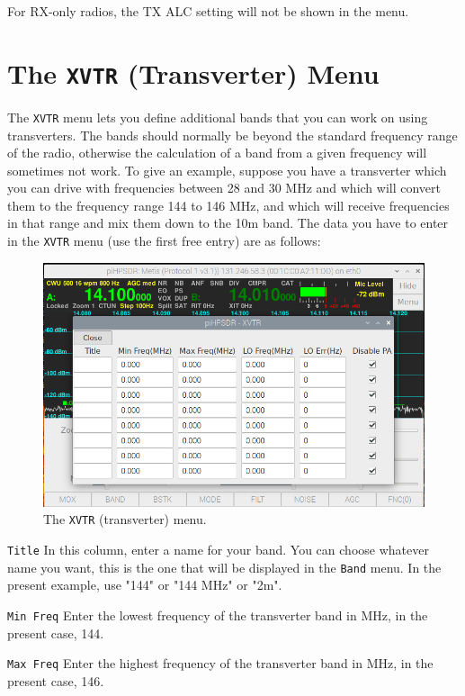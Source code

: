 \documentclass[12pt]{book}
\def\rett#1{\texttt{\color{red}#1}}
\def\bltt#1{\texttt{\color{blue}#1}}
\begin{document}
For RX-only radios, the TX ALC setting will not be shown in the menu.

\section{The \texttt{XVTR} (Transverter) Menu}

The \bltt{XVTR} menu lets you define additional bands 
that you can work on using transverters. The bands
should normally be beyond the standard frequency range of
the radio, otherwise the calculation of a band from
a given frequency will sometimes not work. To give an example,
suppose you have a transverter which you can drive with frequencies
between 28 and 30 MHz and which will convert them to the frequency
range 144 to 146 MHz, and which will receive frequencies in that
range and mix them down to the 10m band. The data you have to enter
in the \bltt{XVTR} menu (use the first free entry) are as follows:
\begin{figure}[ht]
\center
\includegraphics[width=12cm]{XVTRMenu.png}
\caption{The \bltt{XVTR} (transverter) menu.}
\label{fig:XVTRMenu}
\end{figure}



\rett{Title} In this column, enter a name for your band. You can choose
whatever name you want, this is the one that will be displayed in the
\bltt{Band} menu. In the present example, use "144" or "144 MHz" or "2m".

\rett{Min Freq} Enter the lowest frequency of the transverter band in MHz,
in the present case, 144.

\rett{Max Freq} Enter the highest frequency of the transverter band in MHz,
in the present case, 146.
\end{document}
